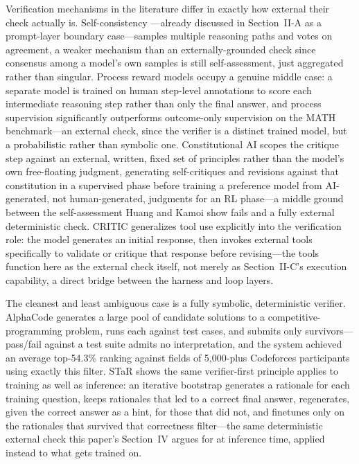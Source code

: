 \documentclass[journal]{IEEEtran}
\begin{document}
Verification mechanisms in the literature differ in exactly how external their check actually is. Self-consistency \cite{wang2022selfconsistency}---already discussed in Section~II-A as a prompt-layer boundary case---samples multiple reasoning paths and votes on agreement, a weaker mechanism than an externally-grounded check since consensus among a model's own samples is still self-assessment, just aggregated rather than singular. Process reward models \cite{lightman2023lets} occupy a genuine middle case: a separate model is trained on human step-level annotations to score each intermediate reasoning step rather than only the final answer, and process supervision significantly outperforms outcome-only supervision on the MATH benchmark---an external check, since the verifier is a distinct trained model, but a probabilistic rather than symbolic one. Constitutional AI \cite{bai2022constitutional} scopes the critique step against an external, written, fixed set of principles rather than the model's own free-floating judgment, generating self-critiques and revisions against that constitution in a supervised phase before training a preference model from AI-generated, not human-generated, judgments for an RL phase---a middle ground between the self-assessment Huang and Kamoi show fails and a fully external deterministic check. CRITIC \cite{gou2023critic} generalizes tool use explicitly into the verification role: the model generates an initial response, then invokes external tools specifically to validate or critique that response before revising---the tools function here as the external check itself, not merely as Section~II-C's execution capability, a direct bridge between the harness and loop layers.

The cleanest and least ambiguous case is a fully symbolic, deterministic verifier. AlphaCode \cite{li2022competitionlevel} generates a large pool of candidate solutions to a competitive-programming problem, runs each against test cases, and submits only survivors---pass/fail against a test suite admits no interpretation, and the system achieved an average top-54.3\% ranking against fields of 5,000-plus Codeforces participants using exactly this filter. STaR \cite{zelikman2022star} shows the same verifier-first principle applies to training as well as inference: an iterative bootstrap generates a rationale for each training question, keeps rationales that led to a correct final answer, regenerates, given the correct answer as a hint, for those that did not, and finetunes only on the rationales that survived that correctness filter---the same deterministic external check this paper's Section~IV argues for at inference time, applied instead to what gets trained on.
\end{document}
